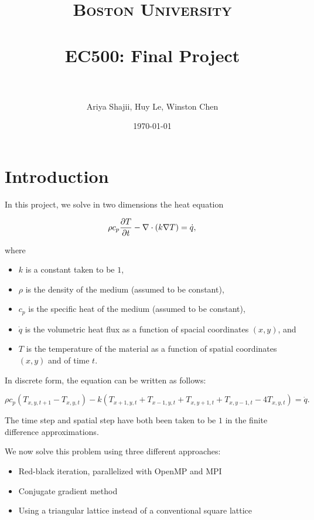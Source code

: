 \documentclass[paper=a4, fontsize=11pt]{scrartcl} %
\title{	
\normalfont \normalsize 
\textsc{Boston University} \\ [25pt] %
\horrule{0.5pt} \\[0.4cm] %
\huge EC500: Final Project \\
\horrule{2pt} \\[0.5cm] %
}
\author{Ariya Shajii, Huy Le, Winston Chen}
\date{\normalsize\today}
\numberwithin{equation}{section} %
\numberwithin{figure}{section} %
\numberwithin{table}{section} %
\begin{document}
\maketitle


\section{Introduction}

In this project, we solve in two dimensions the heat equation

\begin{equation}
	\rho c_p {\partial T \over \partial t} - \nabla \cdot (k \nabla T) = \dot{q},
	\label{eq:main}
\end{equation}

where

\begin{itemize}
	\item $k$ is a constant taken to be $1$,
	\item $\rho$ is the density of the medium (assumed to be constant),
	\item $c_p$ is the specific heat of the medium (assumed to be constant),
	\item $\dot{q}$ is the volumetric heat flux as a function of spacial coordinates $(x,y)$, and
	\item $T$ is the temperature of the material as a function of spatial coordinates $(x,y)$ and of time $t$.
\end{itemize}

In discrete form, the equation can be written as follows:

\begin{equation}
	\rho c_p (T_{x,y,t+1} - T_{x,y,t}) -
	k (T_{x+1,y,t} + T_{x-1,y,t} + T_{x,y+1,t} + T_{x,y-1,t} - 4T_{x,y,t}) = \dot{q}.
\end{equation}

The time step and spatial step have both been taken to be $1$ in the finite difference approximations. \linebreak

We now solve this problem using three different approaches:

\begin{itemize}
	\item Red-black iteration, parallelized with OpenMP and MPI
	\item Conjugate gradient method
	\item Using a triangular lattice instead of a conventional square lattice
\end{itemize}
\end{document}
